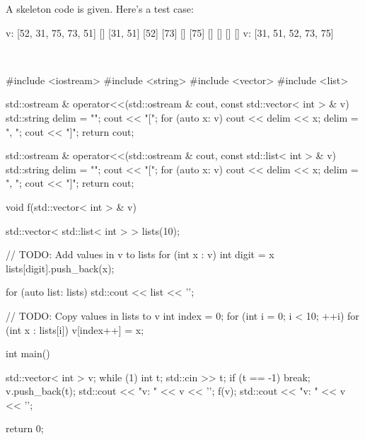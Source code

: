 A skeleton code is given. Here's a test case:
\begin{console}[commandchars=\\\{\},fontsize=\small]
v: [52, 31, 75, 73, 51]
[]
[31, 51]
[52]
[73]
[]
[75]
[]
[]
[]
[]
v: [31, 51, 52, 73, 75]
\end{console}
\\
\ANSWER
\begin{answercode}
#include <iostream>
#include <string>
#include <vector>
#include <list>

std::ostream & operator<<(std::ostream & cout, const std::vector< int > & v)
{
    std::string delim = "";
    cout << "[";
    for (auto x: v)
    {
        cout << delim << x;
        delim = ", ";
    }
    cout << "]";
    return cout;
}

std::ostream & operator<<(std::ostream & cout, const std::list< int > & v)
{
    std::string delim = "";
    cout << "[";
    for (auto x: v)
    {
        cout << delim << x;
        delim = ", ";
    }
    cout << "]";
    return cout;
}

void f(std::vector< int > & v)
{
    std::vector< std::list< int > > lists(10);

    // TODO: Add values in v to lists
    for (int x : v)
    {
        int digit = x %
        lists[digit].push_back(x);
    }

    for (auto list: lists)
    {
        std::cout << list << '\n';
    }

    // TODO: Copy values in lists to v
    int index = 0;
    for (int i = 0; i < 10; ++i)
    {
        for (int x : lists[i])
        {
            v[index++] = x;
        }
    }
    
}

int main()
{
    std::vector< int > v;
    while (1)
    {
        int t;
        std::cin >> t;
        if (t == -1) break;
        v.push_back(t);
    }
    std::cout << "v: " << v << '\n';
    f(v);
    std::cout << "v: " << v << '\n';

    return 0;
}
\end{answercode}


